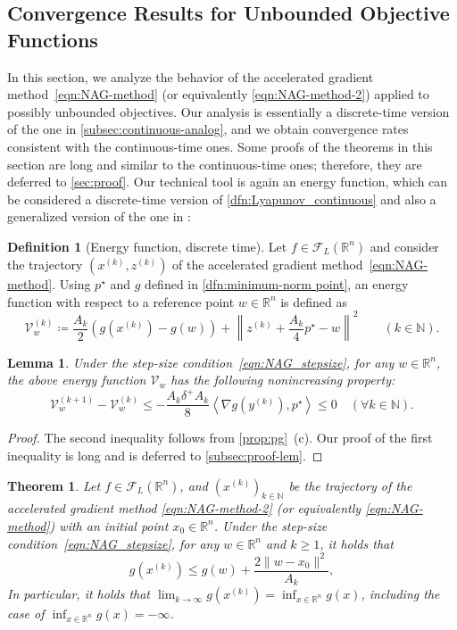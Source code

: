 \documentclass[11pt,a4paper]{article}
\theoremstyle{definition}
\newtheorem{dfn}{Definition}[section]
\theoremstyle{plain}
\newtheorem{thm}{Theorem}[section]
\newtheorem{lem}[lem]{Lemma}
\newcommand{\RR}{{\mathbb{R}}}
\newcommand{\NN}{{\mathbb{N}}}
\begin{document}
\subsection{Convergence Results for Unbounded Objective Functions}\label{subsec:discrete}
In this section, we analyze the behavior of the accelerated gradient method~\eqref{eqn:NAG-method} (or equivalently \eqref{eqn:NAG-method-2}) applied to possibly unbounded objectives.
Our analysis is essentially a discrete-time version of the one in \cref{subsec:continuous-analog}, and we obtain convergence rates consistent with the continuous-time ones.
Some proofs of the theorems in this section are long and similar to the continuous-time ones; therefore, they are deferred to \cref{sec:proof}.
Our technical tool is again an energy function, which can be considered a discrete-time version of \cref{dfn:Lyapunov_continuous} and also a generalized version of the one in \cite{USM2023}:
\begin{dfn}[Energy function, discrete time]
    \label{dfn:Lyapunov_discrete}
    Let $f \in \mathcal{F}_L(\RR^n)$ and consider the trajectory $\left(x^{(k)}, z^{(k)}\right)$ of the accelerated gradient method~\eqref{eqn:NAG-method}.
    Using $p^\star$ and $g$ defined in \cref{dfn:minimum-norm point}, an energy function with respect to a reference point $w \in \RR^n$ is defined as
    \[
        \mathcal{V}_w^{(k)} \coloneqq \frac{A_k}2\left(g\left(x^{(k)}\right) - g(w)\right) + \left\|z^{(k)} + \frac{A_k}4p^\star - w\right\|^2 \qquad (k \in \NN).
    \]
\end{dfn}
\begin{lem}\label{lem:Lyapunov_discrete}
    Under the step-size condition~\eqref{eqn:NAG_stepsize}, for any $w \in \RR^n$, the above energy function $\mathcal{V}_w$ has the following nonincreasing property:
    \[
        \mathcal{V}_w^{(k + 1)} - \mathcal{V}_w^{(k)} \le -\frac{A_k\delta^+A_k}8\left\langle\nabla g\left(y^{(k)}\right), p^\star\right\rangle \le 0 \quad (\forall k \in \NN).
    \]
\end{lem}
\begin{proof}
The second inequality follows from \cref{prop:pg}~(c).
Our proof of the first inequality is long and is deferred to \cref{subsec:proof-lem}.
\end{proof}
\begin{thm}\label{thm:NAG_value_discrete}
    Let $f \in \mathcal{F}_L(\RR^n)$, and $\left(x^{(k)}\right)_{k \in \NN}$ be the trajectory of the accelerated gradient method \eqref{eqn:NAG-method-2} (or equivalently \eqref{eqn:NAG-method}) with an initial point $x_0 \in \RR^n$.
    Under the step-size condition~\eqref{eqn:NAG_stepsize}, for any $w \in \RR^n$ and $k \ge 1$, it holds that
    \[
        g\left(x^{(k)}\right) \le g(w) + \frac{2\|w - x_0\|^2}{A_k},
    \]
    In particular, it holds that $\lim_{k \to \infty}g\left(x^{(k)}\right) = \inf_{x \in \RR^n} g(x)$, including the case of $\inf_{x \in \RR^n} g(x) = -\infty$.
\end{thm}
\end{document}
